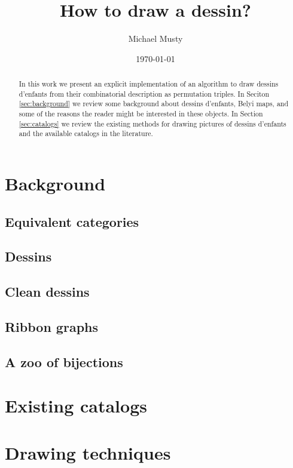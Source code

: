 \documentclass{amsart}
\numberwithin{equation}{section}
\theoremstyle{definition}
\theoremstyle{remark}
\begin{document}
\title{How to draw a dessin?}

\author{Michael Musty}
\address{ICERM, Providence RI, Fall 2019}

\date{\today}

\begin{abstract}
  In this work we present an explicit implementation
  of an algorithm to draw dessins d'enfants from their
  combinatorial description as permutation triples.
  In Seciton \ref{sec:background}
  we review some background about dessins d'enfants,
  Belyi maps, and some of the reasons the reader
  might be interested in these objects.
  In Section \ref{sec:catalogs}
  we review the existing methods for drawing
  pictures of dessins d'enfants and the available
  catalogs in the literature.
\end{abstract}

\maketitle
\tableofcontents

\section{Background}{\label{sec:background}
  \subsection{Equivalent categories}{
    \subsection{Dessins}{
    }
    \subsection{Clean dessins}{
    }
    \subsection{Ribbon graphs}{
    }
    \subsection{A zoo of bijections}{
    }
  }
}
\section{Existing catalogs}{\label{sec:catalogs}
}
\section{Drawing techniques}{
}
\end{document}
